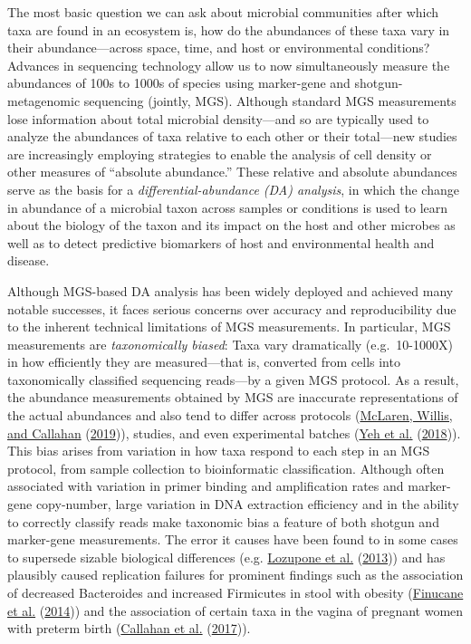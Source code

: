 \documentclass[
]{article}
\theoremstyle{definition}
\theoremstyle{definition}
\theoremstyle{definition}
\theoremstyle{definition}
\theoremstyle{remark}
\begin{document}
The most basic question we can ask about microbial communities after which taxa are found in an ecosystem is, how do the abundances of these taxa vary in their abundance---across space, time, and host or environmental conditions?
Advances in sequencing technology allow us to now simultaneously measure the abundances of 100s to 1000s of species using marker-gene and shotgun-metagenomic sequencing (jointly, MGS).
Although standard MGS measurements lose information about total microbial density---and so are typically used to analyze the abundances of taxa relative to each other or their total---new studies are increasingly employing strategies to enable the analysis of cell density or other measures of ``absolute abundance.''
These relative and absolute abundances serve as the basis for a \emph{differential-abundance (DA) analysis}, in which the change in abundance of a microbial taxon across samples or conditions is used to learn about the biology of the taxon and its impact on the host and other microbes as well as to detect predictive biomarkers of host and environmental health and disease.

Although MGS-based DA analysis has been widely deployed and achieved many notable successes, it faces serious concerns over accuracy and reproducibility due to the inherent technical limitations of MGS measurements.
In particular, MGS measurements are \emph{taxonomically biased}: Taxa vary dramatically (e.g.~10-1000X) in how efficiently they are measured---that is, converted from cells into taxonomically classified sequencing reads---by a given MGS protocol.
As a result, the abundance measurements obtained by MGS are inaccurate representations of the actual abundances and also tend to differ across protocols (\protect\hyperlink{ref-mclaren2019cons}{McLaren, Willis, and Callahan} (\protect\hyperlink{ref-mclaren2019cons}{2019})), studies, and even experimental batches (\protect\hyperlink{ref-yeh2018taxo}{Yeh et al.} (\protect\hyperlink{ref-yeh2018taxo}{2018})).
This bias arises from variation in how taxa respond to each step in an MGS protocol, from sample collection to bioinformatic classification.
Although often associated with variation in primer binding and amplification rates and marker-gene copy-number, large variation in DNA extraction efficiency and in the ability to correctly classify reads make taxonomic bias a feature of both shotgun and marker-gene measurements.
The error it causes have been found to in some cases to supersede sizable biological differences (e.g. \protect\hyperlink{ref-lozupone2013meta}{Lozupone et al.} (\protect\hyperlink{ref-lozupone2013meta}{2013})) and has plausibly caused replication failures for prominent findings such as the association of decreased Bacteroides and increased Firmicutes in stool with obesity (\protect\hyperlink{ref-finucane2014atax}{Finucane et al.} (\protect\hyperlink{ref-finucane2014atax}{2014})) and the association of certain taxa in the vagina of pregnant women with preterm birth (\protect\hyperlink{ref-callahan2017repl}{Callahan et al.} (\protect\hyperlink{ref-callahan2017repl}{2017})).
\end{document}
